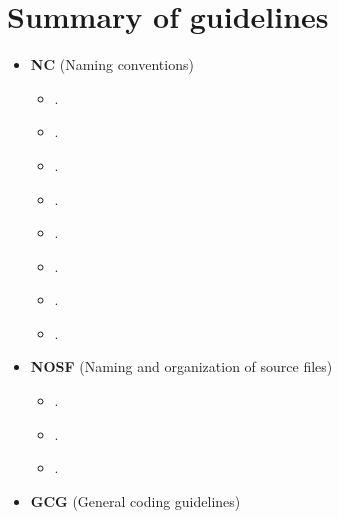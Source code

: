 %
\section{Summary of guidelines}
\label{sec:summary_guidelines}
%

\begin{itemize}

\item\textbf{NC} (Naming conventions)

  \setcounter{Thyra_NC_counter}{0}

  \begin{itemize}
  {}\item\NCClassNames.
  {}\item\NCNamespaceNames.
  {}\item\NCEnumNames.
  {}\item\NCObjectNames.
  {}\item\NCDataMemberNames.
  {}\item\NCFunctionNames.
  {}\item\NCBaseDefaultClassNames.
  {}\item\NCConstNonconstAccessFunctionName.
  \end{itemize}

\item\textbf{NOSF} (Naming and organization of source files)

  \setcounter{Thyra_NOSF_counter}{0}

  \begin{itemize}
  {}\item\NOSFFileExtension.
  {}\item\NOSFClassFiles.
  {}\item\NOSFIncludeGuards.
  \end{itemize}

\item\textbf{GCG} (General coding guidelines)

  \setcounter{Thyra_GCG_counter}{0}


\end{itemize}
